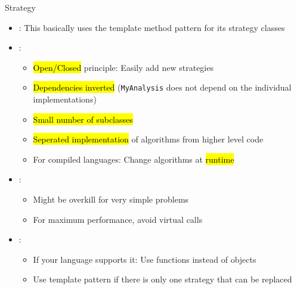 \begin{frame}{Strategy}
	\begin{itemize}
		\item {}: This basically uses the template method pattern for its strategy classes
		\item {}:
		\begin{itemize}
			\item \hl{Open/Closed} principle: Easily add new strategies
			\item \hl{Dependencies inverted} (\texttt{MyAnalysis} does not depend on the individual implementations)
			\item \hl{Small number of subclasses}
			\item \hl{Seperated implementation} of algorithms from higher level code
			\item For compiled languages: Change algorithms at \hl{runtime}
		\end{itemize}
		\item {}: 
			\begin{itemize}
				\item Might be overkill for very simple problems
				\item For maximum performance, avoid virtual calls
			\end{itemize}
		\item {}:
		\begin{itemize}
			\item If your language supports it: Use functions instead of objects 
			\item Use template pattern if there is only one strategy that can be replaced
		\end{itemize}
	\end{itemize}
\end{frame}


